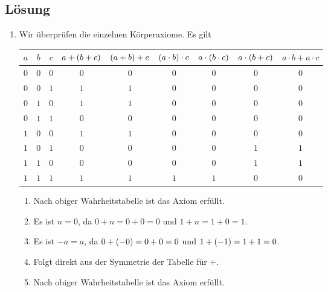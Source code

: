 \documentclass[german,12pt]{homework}
\DeclarePairedDelimiter{\enbrace}{(}{)}
\begin{document}
    \subsection*{Lösung}
    \begin{enumerate}
        \item Wir überprüfen die einzelnen Körperaxiome. Es gilt
        \begin{center}
            \begin{tabular}{ccccccccc}
                \toprule
                \(a\) & \(b\) & \(c\) & \(a + \enbrace*{b + c}\) & \(\enbrace*{a + b} + c\) & \(\enbrace*{a \cdot b} \cdot c\) & \(a \cdot \enbrace*{b \cdot c}\) & \(a \cdot \enbrace*{b + c}\) & \(a \cdot b + a \cdot c\)\\
                \midrule
                \(0\) & \(0\) & \(0\) & \(0\) & \(0\) & \(0\) & \(0\) & \(0\) & \(0\)\\
                \(0\) & \(0\) & \(1\) & \(1\) & \(1\) & \(0\) & \(0\) & \(0\) & \(0\)\\
                \(0\) & \(1\) & \(0\) & \(1\) & \(1\) & \(0\) & \(0\) & \(0\) & \(0\)\\
                \(0\) & \(1\) & \(1\) & \(0\) & \(0\) & \(0\) & \(0\) & \(0\) & \(0\)\\
                \(1\) & \(0\) & \(0\) & \(1\) & \(1\) & \(0\) & \(0\) & \(0\) & \(0\)\\
                \(1\) & \(0\) & \(1\) & \(0\) & \(0\) & \(0\) & \(0\) & \(1\) & \(1\)\\
                \(1\) & \(1\) & \(0\) & \(0\) & \(0\) & \(0\) & \(0\) & \(1\) & \(1\)\\
                \(1\) & \(1\) & \(1\) & \(1\) & \(1\) & \(1\) & \(1\) & \(0\) & \(0\)\\
                \bottomrule
            \end{tabular}
        \end{center}
        \begin{enumerate}[label=(A\arabic*)]
            \item Nach obiger Wahrheitstabelle ist das Axiom erfüllt.
            \item Es ist \(n = 0\), da \(0 + n = 0 + 0 = 0\) und \(1 + n = 1 + 0 = 1\).
            \item Es ist \(-a = a\), da \(0 + \enbrace*{-0} = 0 + 0 = 0\) und \(1 + \enbrace*{-1} = 1 + 1 = 0\).
            \item Folgt direkt aus der Symmetrie der Tabelle für \(+\).
            \item Nach obiger Wahrheitstabelle ist das Axiom erfüllt.

\end{enumerate}
\end{enumerate}
\end{document}
